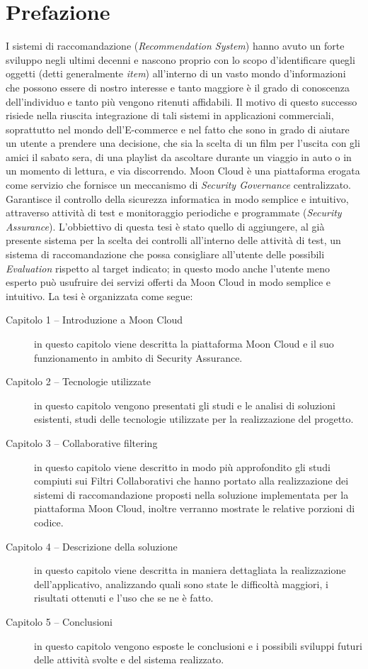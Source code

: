 \chapter{Prefazione}\label{chp:00-prefaction}
I sistemi di raccomandazione (\textit{Recommendation System}) hanno avuto un forte sviluppo negli ultimi decenni e
nascono proprio con lo scopo d'identificare quegli oggetti (detti generalmente \textit{item}) all'interno di un vasto 
mondo d'informazioni che possono essere di nostro interesse e tanto maggiore è il grado di conoscenza dell'individuo 
e tanto più vengono ritenuti affidabili.\hfill\break
Il motivo di questo successo risiede nella riuscita integrazione di tali sistemi in applicazioni commerciali, 
soprattutto nel mondo dell’E-commerce e nel fatto che sono in grado di aiutare un utente a prendere una decisione, che sia la scelta di 
un film per l'uscita con gli amici il sabato sera, di una playlist da ascoltare durante un viaggio in auto o in un momento di lettura, 
e via discorrendo.\hfill\break
Moon Cloud è una piattaforma erogata come servizio che fornisce un meccanismo di \textit{Security Governance} centralizzato. 
Garantisce il controllo della sicurezza informatica in modo semplice e intuitivo, attraverso attività di test e monitoraggio 
periodiche e programmate (\textit{Security Assurance}). L'obbiettivo di questa tesi è stato quello di aggiungere, al già 
presente sistema per la scelta dei controlli all'interno delle attività di test, un sistema di raccomandazione che possa 
consigliare all'utente delle possibili \textit{Evaluation} rispetto al target indicato; in questo modo anche l'utente meno esperto può 
usufruire dei servizi offerti da Moon Cloud in modo semplice e intuitivo.  
\vspace{0.5cm}
\hfill \break
La tesi è organizzata come segue:
\begin{description}
    \item[Capitolo 1 -- Introduzione a Moon Cloud] in questo capitolo viene descritta la piattaforma Moon Cloud e il suo funzionamento
    in ambito di Security Assurance. 
    \item[Capitolo 2 -- Tecnologie utilizzate] in questo capitolo vengono presentati gli studi e le analisi di soluzioni esistenti, 
    studi delle tecnologie utilizzate per la realizzazione del progetto.
    \item[Capitolo 3 -- Collaborative filtering] in questo capitolo viene descritto in modo più approfondito gli studi compiuti sui
    Filtri Collaborativi che hanno portato alla realizzazione dei sistemi di raccomandazione proposti nella soluzione implementata 
    per la piattaforma Moon Cloud, inoltre verranno mostrate le relative porzioni di codice. 
    \item[Capitolo 4 -- Descrizione della soluzione] in questo capitolo viene descritta in maniera dettagliata la realizzazione 
    dell'applicativo, analizzando quali sono state le difficoltà maggiori, i risultati ottenuti e l'uso che se ne è fatto. 
    \item[Capitolo 5 -- Conclusioni] in questo capitolo vengono esposte le conclusioni e i possibili sviluppi futuri delle attività
    svolte e del sistema realizzato.
\end{description}
